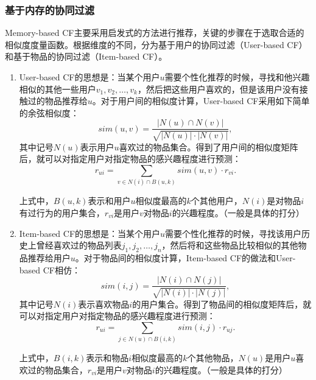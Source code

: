       \subsubsection{基于内存的协同过滤}
      Memory-based CF主要采用启发式的方法进行推荐，关键的步骤在于选取合适的相似度度量函数。根据维度的不同，分为基于用户的{}协同过滤（User-based CF）和基于物品的协同过滤（Item-based CF）。\cite{wang2006unifying}
      \begin{enumerate}
        \item User-based CF的思想是：当某个用户$u$需要个性化推荐的时候，寻找和他兴趣相似的其他一些用户$v_1,v_2,\ldots,v_k$，然后把这些用户喜欢的，但是该用户没有接触过的物品推荐给$u$。对于用户间的相似度计算，User-based CF采用如下简单的余弦相似度：
        \begin{equation}
        sim(u,v)=\frac{|N(u)\cap N(v)|}{\sqrt{|N(u)|\cdot|N(v)|}},
        \end{equation}
        其中记号$N(u)$表示用户$u$喜欢过的物品集合。得到了用户间的相似度矩阵后，就可以对指定用户对指定物品的感兴趣程度进行预测：
        \begin{equation}
        r_{ui} = \sum\limits_{v\in N(i)\cap B(u,k)}sim(u,v)\cdot r_{vi}.
        \end{equation}

        上式中，$B(u,k)$表示和用户$u$相似度最高的$k$个其他用户，$N(i)$是对物品$i$有过行为的用户集合，$r_{vi}$是用户$v$对物品$i$的兴趣程度。（一般是具体的打分）

        \item Item-based CF的思想是：当某个用户$u$需要个性化推荐的时候，寻找该用户历史上曾经喜欢过的物品列表$j_1,j_2,\ldots, j_n$，然后将和这些物品比较相似的其他物品推荐给用户$u$。对于物品间的相似度计算，Item-based CF的做法和User-based CF相仿：
        \begin{equation}
        sim(i,j)=\frac{|N(i)\cap N(j)|}{\sqrt{|N(i)|\cdot|N(j)|}},
        \end{equation}
        其中记号$N(i)$表示喜欢物品$i$的用户集合。得到了物品间的相似度矩阵后，就可以对指定用户对指定物品的感兴趣程度进行预测：
        \begin{equation}
        r_{ui} = \sum\limits_{j\in N(u)\cap B(i,k)}sim(i,j)\cdot r_{uj}.
        \end{equation}

        上式中，$B(i,k)$表示和物品$i$相似度最高的$k$个其他物品，$N(u)$是用户$u$喜欢过的物品集合，$r_{vi}$是用户$v$对物品$i$的兴趣程度。（一般是具体的打分）
      \end{enumerate}

